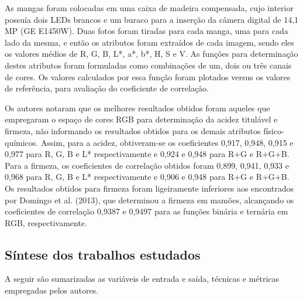 As mangas foram colocadas em uma caixa de madeira compensada, cujo interior possuía dois LEDs brancos e um buraco para a inserção da câmera digital de 14,1 MP (GE E1450W). Duas fotos foram tiradas para cada manga, uma para cada lado da mesma, e então os atributos foram extraídos de cada imagem, sendo eles os valores médios de R, G, B, L*, a*, b*, H, S e V. As funções para determinação destes atributos foram formuladas como combinações de um, dois ou três canais de cores. Os valores calculados por essa função foram plotados versus os valores de referência, para avaliação do coeficiente de correlação. 

Os autores notaram que os melhores resultados obtidos foram aqueles que empregaram o espaço de cores RGB para determinação da acidez titulável e firmeza, não informando os resultados obtidos para os demais atributos físico-químicos. Assim, para a acidez, obtiveram-se os coeficientes 0,917, 0,948, 0,915 e 0,977 para R, G, B e L* respectivamente e 0,924 e 0,948 para R+G e R+G+B. Para a firmeza, os coeficientes de correlação obtidos foram 0,899, 0,941, 0,933 e 0,968 para R, G, B e L* respectivamente e 0,906 e 0,948 para R+G e R+G+B. Os resultados obtidos para firmeza foram ligeiramente inferiores aos encontrados por Domingo et al. (2013), que determinou a firmeza em mamões, alcançando os coeficientes de correlação 0,9387 e 0,9497 para as funções binária e ternária em RGB, respectivamente. 	

\subsection{Síntese dos trabalhos estudados}

A seguir são sumarizadas as variáveis de entrada e saída, técnicas e métricas empregadas pelos autores.

